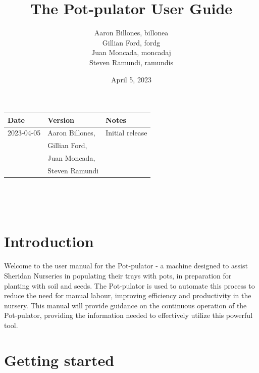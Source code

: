 \documentclass[12pt, titlepage]{article}
\title{The Pot-pulator User Guide}
\author{Aaron Billones, billonea\\Gillian Ford, fordg\\Juan Moncada, moncadaj\\Steven Ramundi, ramundis}
\date{April 5, 2023}
\begin{document}
\maketitle
\thispagestyle{empty}


\begin{tabularx}{\textwidth}{p{3cm}p{4cm}X}
    \toprule {\bf Date} & {\bf Version} & {\bf Notes}\\
    \midrule
    2023-04-05 & Aaron Billones,& Initial release\\&Gillian Ford,\\&Juan Moncada,\\&Steven Ramundi \\
    
    \bottomrule
\end{tabularx}

~\newpage

\tableofcontents

~\newpage


\section{Introduction}

Welcome to the user manual for the Pot-pulator - a machine designed to assist Sheridan Nurseries in populating their trays with pots, in preparation for planting with soil and seeds. The Pot-pulator is used to automate this process to reduce the need for manual labour, improving efficiency and productivity in the nursery. This manual will provide guidance on the continuous operation of the Pot-pulator, providing the information needed to effectively utilize this powerful tool.

\section{Getting started}
\end{document}
